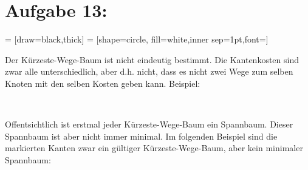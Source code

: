 \documentclass[11pt]{scrartcl} %
\begin{document}
\newpage
\section*{Aufgabe 13:}
 = [draw=black,thick]
 = [shape=circle, fill=white,inner sep=1pt,font=\small]
\begin{compactenum}[(a)]
\item Der Kürzeste-Wege-Baum ist nicht eindeutig bestimmt. Die Kantenkosten sind zwar alle unterschiedlich, aber d.h. nicht, dass es nicht zwei Wege zum selben Knoten mit den selben Kosten geben kann. Beispiel:\\
    \begin{center}
    \\[0.5cm]
    \end{center}

\item Offentsichtlich ist erstmal jeder Kürzeste-Wege-Baum ein Spannbaum. Dieser Spannbaum ist aber nicht immer minimal. Im folgenden Beispiel sind die markierten Kanten zwar ein gültiger Kürzeste-Wege-Baum, aber kein minimaler Spannbaum:\\
    \begin{center}
    \\[0.5cm]
    \end{center}
\end{compactenum}
\end{document}
